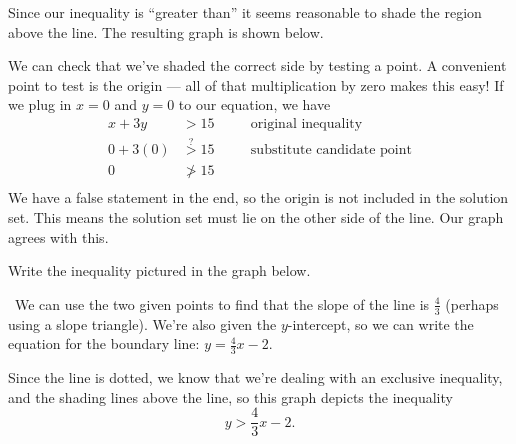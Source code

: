 Since our inequality is ``greater than'' it seems reasonable to shade the region above the line. The resulting graph is shown below.

\begin{center}
\end{center}

We can check that we've shaded the correct side by testing a point. A convenient point to test is the origin --- all of that multiplication by zero makes this easy! If we plug in $x = 0$ and $y = 0$ to our equation, we have
\[\begin{aligned}
x+3y &> 15
&& \quad\text{original inequality}\\
0+3(0) &\overset{?}{>} 15
&& \quad\text{substitute candidate point}\\
0 &{\ngtr} 15
&& \quad\text{}\\
\end{aligned}\]
We have a false statement in the end, so the origin is not included in the solution set. This means the solution set must lie on the other side of the line. Our graph agrees with this.

\begin{boxedex}
Write the inequality pictured in the graph below.

\begin{center}
\end{center}

\exsoln\ We can use the two given points to find that the slope of the line is $\frac{4}{3}$ (perhaps using a slope triangle). We're also given the $y$-intercept, so we can write the equation for the boundary line: $y=\frac{4}{3}x-2$.

Since the line is dotted, we know that we're dealing with an exclusive inequality, and the shading lines above the line, so this graph depicts the inequality \[y > \frac{4}{3}x-2.\]
\end{boxedex}

